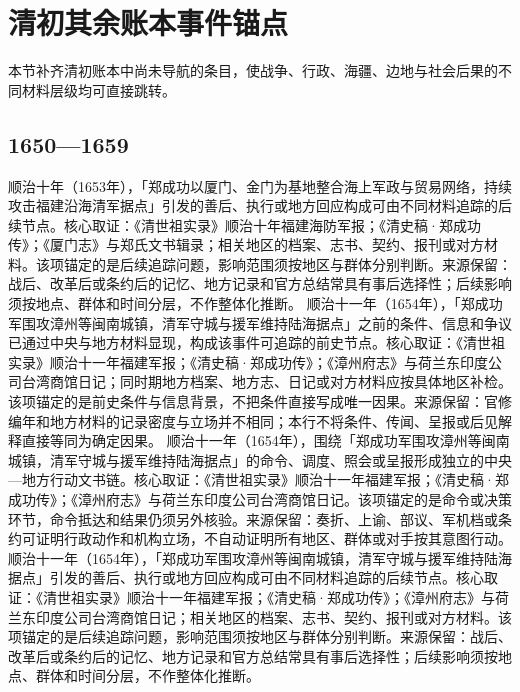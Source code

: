 \section{清初其余账本事件锚点}
本节补齐清初账本中尚未导航的条目，使战争、行政、海疆、边地与社会后果的不同材料层级均可直接跳转。
\subsection{1650—1659}
顺治十年（1653年），「郑成功以厦门、金门为基地整合海上军政与贸易网络，持续攻击福建沿海清军据点」引发的善后、执行或地方回应构成可由不同材料追踪的后续节点。核心取证：《清世祖实录》顺治十年福建海防军报；《清史稿·郑成功传》；《厦门志》与郑氏文书辑录；相关地区的档案、志书、契约、报刊或对方材料。该项锚定的是后续追踪问题，影响范围须按地区与群体分别判断。来源保留：战后、改革后或条约后的记忆、地方记录和官方总结常具有事后选择性；后续影响须按地点、群体和时间分层，不作整体化推断。
顺治十一年（1654年），「郑成功军围攻漳州等闽南城镇，清军守城与援军维持陆海据点」之前的条件、信息和争议已通过中央与地方材料显现，构成该事件可追踪的前史节点。核心取证：《清世祖实录》顺治十一年福建军报；《清史稿·郑成功传》；《漳州府志》与荷兰东印度公司台湾商馆日记；同时期地方档案、地方志、日记或对方材料应按具体地区补检。该项锚定的是前史条件与信息背景，不把条件直接写成唯一因果。来源保留：官修编年和地方材料的记录密度与立场并不相同；本行不将条件、传闻、呈报或后见解释直接等同为确定因果。
顺治十一年（1654年），围绕「郑成功军围攻漳州等闽南城镇，清军守城与援军维持陆海据点」的命令、调度、照会或呈报形成独立的中央—地方行动文书链。核心取证：《清世祖实录》顺治十一年福建军报；《清史稿·郑成功传》；《漳州府志》与荷兰东印度公司台湾商馆日记。该项锚定的是命令或决策环节，命令抵达和结果仍须另外核验。来源保留：奏折、上谕、部议、军机档或条约可证明行政动作和机构立场，不自动证明所有地区、群体或对手按其意图行动。
顺治十一年（1654年），「郑成功军围攻漳州等闽南城镇，清军守城与援军维持陆海据点」引发的善后、执行或地方回应构成可由不同材料追踪的后续节点。核心取证：《清世祖实录》顺治十一年福建军报；《清史稿·郑成功传》；《漳州府志》与荷兰东印度公司台湾商馆日记；相关地区的档案、志书、契约、报刊或对方材料。该项锚定的是后续追踪问题，影响范围须按地区与群体分别判断。来源保留：战后、改革后或条约后的记忆、地方记录和官方总结常具有事后选择性；后续影响须按地点、群体和时间分层，不作整体化推断。
